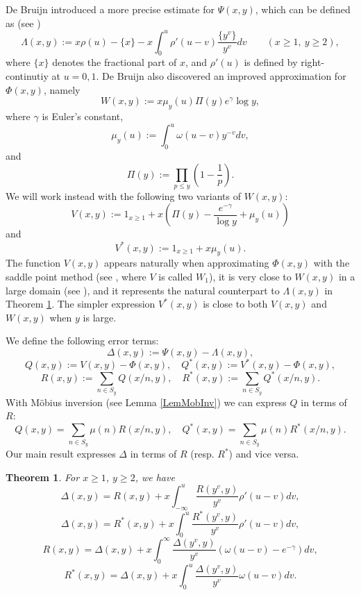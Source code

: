 \documentclass[11pt]{amsart}
\newtheorem{theorem}{Theorem}
\begin{document}
De Bruijn \cite{BruI} introduced a more precise estimate for $\Psi(x,y)$, which can be defined as
(see \cite[Eq III.5.81]{Ten}) 
\begin{equation}\label{LambdaDef}
\Lambda(x,y) := x \rho(u)-\{x\}-x\int_0^u \rho'(u-v) \frac{\{y^v\}}{y^v} dv \qquad (x\ge 1, \ y\ge 2),
\end{equation}
where $\{x\}$ denotes the fractional part of $x$, and $\rho'(u)$ is defined by right-continutiy at $u=0,1$. 
De Bruijn \cite{Bru} also discovered an improved approximation for $\Phi(x,y)$, namely 
$$
W(x,y):= x \mu_y(u) \Pi(y) e^\gamma \log y,
$$
where $\gamma$ is Euler's constant,
$$
\mu_y(u) := \int_0^u \omega(u-v) y^{-v} dv,
$$
and
$$
\Pi(y) := \prod_{p\le y} \left(1-\frac{1}{p}\right) .
$$
We will work instead with the following two variants of $W(x,y)$:
$$
V(x,y):=1_{x\ge 1} + x \left( \Pi(y) - \frac{e^{-\gamma}}{\log y} +\mu_y(u)\right)
$$
and
$$
V^*(x,y):= 1_{x\ge 1} + x \mu_y(u).
$$
The function $V(x,y)$ appears naturally when approximating 
$\Phi(x,y)$ with the saddle point method (see \cite[Section III.6.4]{Ten}, where $V$ is called $W_1$), 
it is very close to $W(x,y)$ in a large domain (see \cite[Eq III.6.61]{Ten}), and it represents
the natural counterpart to $\Lambda(x,y)$ in Theorem \ref{thm1}.
The simpler expression $V^*(x,y)$ is close to both $V(x,y)$ and $W(x,y)$ when $y$ is large. 

We define the following error terms:
$$\Delta(x,y):= \Psi(x,y) -\Lambda(x,y),$$
$$
Q(x,y):= V(x,y) - \Phi(x,y), \quad Q^*(x,y):=V^*(x,y) - \Phi(x,y),
$$
$$
R(x,y):= \sum_{n\in S_y} Q(x/n,y), \quad R^*(x,y):= \sum_{n\in S_y} Q^*(x/n,y).
$$
With M\"{o}bius inversion (see Lemma \ref{LemMobInv}) we can express $Q$ in terms of $R$:
$$
Q(x,y)= \sum_{n\in S_y} \mu(n) R(x/n,y), \quad Q^*(x,y)= \sum_{n\in S_y} \mu(n) R^*(x/n,y).
$$
Our main result expresses $\Delta$ in terms of $R$ (resp. $R^*$) and vice versa.

\begin{theorem}\label{thm1}
For $x\ge 1$, $y\ge 2$, we have
\begin{equation}\label{thm1eq1}
\Delta(x,y) =R(x,y) + x \int_{-\infty}^u \frac{R(y^v,y)}{ y^{v}} \rho'(u-v) dv,
\end{equation}
\begin{equation}\label{thm1eq1*}
\Delta(x,y) =R^*(x,y) + x \int_{0}^u \frac{R^*(y^v,y)}{ y^{v}} \rho'(u-v) dv,
\end{equation}
\begin{equation}\label{thm1eq2}
R(x,y) = \Delta(x,y)+x \int_0^\infty \frac{\Delta(y^v,y)}{y^v} \left(\omega(u-v)-e^{-\gamma}\right)  dv,
\end{equation}
\begin{equation}\label{thm1eq2*}
R^*(x,y) = \Delta(x,y)+x \int_0^u \frac{\Delta(y^v,y)}{y^v}\omega(u-v)  dv.
\end{equation}

\end{theorem}
\end{document}
